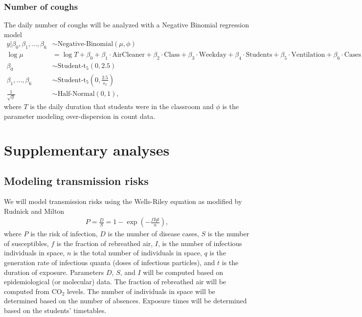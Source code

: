 \documentclass{article}
\begin{document}
\subsubsection{Number of coughs}

The daily number of coughs will be analyzed with a Negative Binomial regression model
\begin{align*}
    y | \beta_0, \beta_1, \dots, \beta_6 &\sim \text{Negative-Binomial}(\mu,\phi) \\
    \log \mu &= \log T + \beta_0 + \beta_1 \cdot \text{AirCleaner} + \beta_2 \cdot \text{Class} + \beta_3 \cdot \text{Weekday} + \beta_4 \cdot \text{Students} + \beta_5 \cdot \text{Ventilation} + \beta_6 \cdot \text{Cases} \\
    \beta_0 &\sim \text{Student-t}_5(0, 2.5) \\
    \beta_1, \dots, \beta_6 &\sim \text{Student-t}_5\left(0, \frac{2.5}{s_{x}}\right) \\
    \frac{1}{\sqrt{\phi}} &\sim \text{Half-Normal}(0,1),
\end{align*}
where $T$ is the daily duration that students were in the classroom and $\phi$ is the parameter modeling over-dispersion in count data. 

\section{Supplementary analyses}

\subsection{Modeling transmission risks}

We will model transmission risks using the Wells-Riley equation \cite{Riley1978AJE} as modified by Rudnick and Milton \cite{Rudnick2003IndoorAir} 
\begin{align*}
    P = \frac{D}{S} = 1 - \exp\left(-\frac{fIqt}{n}\right),
\end{align*}
where $P$ is the risk of infection, $D$ is the number of disease cases, $S$ is the number of susceptibles, $f$ is the fraction of rebreathed air, $I$, is the number of infectious individuals in space, $n$ is the total number of individuals in space, $q$ is the generation rate of infectious quanta (doses of infectious particles), and $t$ is the duration of exposure. Parameters $D$, $S$, and $I$ will be computed based on epidemiological (or molecular) data. The fraction of rebreathed air will be computed from CO$_2$ levels. The number of individuals in space will be determined based on the number of absences. Exposure times will be determined based on the students' timetables. 
\end{document}
